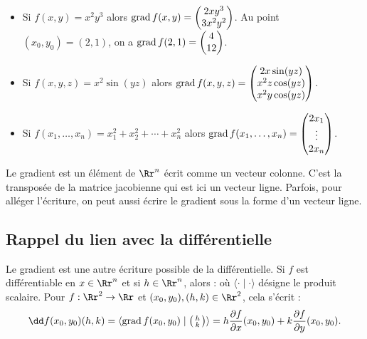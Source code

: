 \documentclass[11pt, class=report,crop=false]{standalone}
\begin{document}
\begin{exemple}
\sauteligne
\begin{itemize}
\item Si $f(x,y) = x^2y^3$ alors $\operatorname{grad} f (x,y) =  \begin{pmatrix}2xy^3\\3x^2y^2\end{pmatrix}$.
Au point $(x_0,y_0)=(2,1)$, on a $\operatorname{grad} f (2,1) =  \begin{pmatrix}4\\12\end{pmatrix}$.

\item Si $f(x,y,z) = x^2\sin(yz)$ alors $\operatorname{grad} f (x,y,z) = \begin{pmatrix} 2x\sin(yz) \\ x^2z \cos(yz) \\ x^2y\cos(yz) \end{pmatrix}$.

\item Si $f(x_1,\ldots,x_n)= x_1^2+x_2^2+\cdots + x_n^2$ alors $\operatorname{grad} f (x_1,\ldots,x_n) =  \begin{pmatrix}2x_1\\ \vdots \\2x_n\end{pmatrix}$.
\end{itemize}
\end{exemple}

\begin{remarque*}
Le gradient est un élément de $\Rr^n$ écrit comme un vecteur colonne. C'est la transposée de la matrice jacobienne qui est ici un vecteur ligne. Parfois, pour alléger l'écriture, on peut aussi écrire le gradient sous la forme d'un vecteur ligne.
\end{remarque*}


\subsection{Rappel du lien avec la différentielle}



Le gradient est une autre écriture possible de la différentielle.
Si $f$ est différentiable en $x \in \Rr^n$ et si $h \in \Rr^n$, alors :
où $\langle \cdot \mid \cdot \rangle$ désigne le produit scalaire.
Pour $f: \Rr^2 \to \Rr$ et $(x_0,y_0),(h,k) \in \Rr^2$, cela s'écrit :
$$\dd f (x_0,y_0) (h,k) = \langle \grad f (x_0,y_0) \mid \left(\begin{smallmatrix}h\\k\end{smallmatrix}\right) \rangle
= h\frac{\partial f}{\partial x}(x_0,y_0)
+k\frac{\partial f}{\partial y}(x_0,y_0).$$
\end{document}
